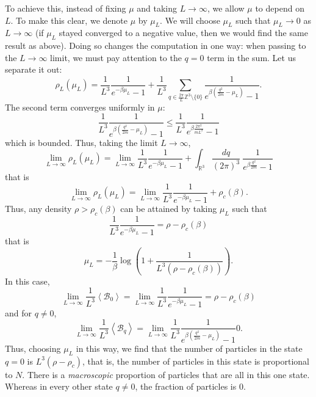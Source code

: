 \documentclass{ian}
\begin{document}
\indent
To achieve this, instead of fixing $\mu$ and taking $L\to\infty$, we allow $\mu$ to depend on $L$.
To make this clear, we denote $\mu$ by $\mu_L$.
We will choose $\mu_L$ such that $\mu_L\to0$ as $L\to\infty$ (if $\mu_L$ stayed converged to a negative value, then we would find the same result as above).
Doing so changes the computation in one way: when passing to the $L\to\infty$ limit, we must pay attention to the $q=0$ term in the sum.
Let us separate it out:
\begin{equation}
  \rho_L(\mu_L)
  =
  \frac1{L^3}
  \frac1{e^{-\beta\mu_L}-1}
  +
  \frac1{L^3}
  \sum_{q\in\frac{2\pi}L\mathbb Z^3\setminus\{0\}}
  \frac1{e^{\beta(\frac{q^2}{2m}-\mu_L)}-1}
  .
\end{equation}
The second term converges uniformly in $\mu$:
\begin{equation}
  \frac1{L^3}\frac1{e^{\beta(\frac{q^2}{2m}-\mu_L)}-1}
  \leqslant
  \frac1{L^3}
  \frac1{e^{\beta\frac{2\pi^2}{mL^2}}-1}
\end{equation}
which is bounded.
Thus, taking the limit $L\to\infty$,
\begin{equation}
  \lim_{L\to\infty}\rho_L(\mu_L)
  =
  \lim_{L\to\infty}
  \frac1{L^3}
  \frac1{e^{-\beta\mu_L}-1}
  +
  \int_{\mathbb R^3}\frac{dq}{(2\pi)^3}\ 
  \frac1{e^{\beta\frac{q^2}{2m}}-1}
\end{equation}
that is
\begin{equation}
  \lim_{L\to\infty}\rho_L(\mu_L)
  =
  \lim_{L\to\infty}
  \frac1{L^3}
  \frac1{e^{-\beta\mu_L}-1}
  +
  \rho_c(\beta)
  .
\end{equation}
Thus, any density $\rho>\rho_c(\beta)$ can be attained by taking $\mu_L$ such that
\begin{equation}
  \frac1{L^3}
  \frac1{e^{-\beta\mu_L}-1}
  =\rho-\rho_c(\beta)
\end{equation}
that is
\begin{equation}
  \mu_L=-\frac1\beta\log\left(1+\frac1{L^3(\rho-\rho_c(\beta))}\right)
  .
\end{equation}
In this case,
\begin{equation}
  \lim_{L\to\infty}\frac1{L^3}\left<\mathcal B_0\right>
  =\lim_{L\to\infty}\frac1{L^3}\frac1{e^{-\beta\mu_L}-1}
  =\rho-\rho_c(\beta)
\end{equation}
and for $q\neq 0$,
\begin{equation}
  \lim_{L\to\infty}\frac1{L^3}\left<\mathcal B_q\right>
  =\lim_{L\to\infty}\frac1{L^3}\frac1{e^{\beta(\frac{q^2}{2m}-\mu_L)}-1}
  0
  .
\end{equation}
Thus, choosing $\mu_L$ in this way, we find that the number of particles in the state $q=0$ is $L^3(\rho-\rho_c)$, that is, the number of particles in this state is proportional to $N$.
There is a {\it macroscopic} proportion of particles that are all in this one state.
Whereas in every other state $q\neq0$, the fraction of particles is 0.
\bigskip
\end{document}
